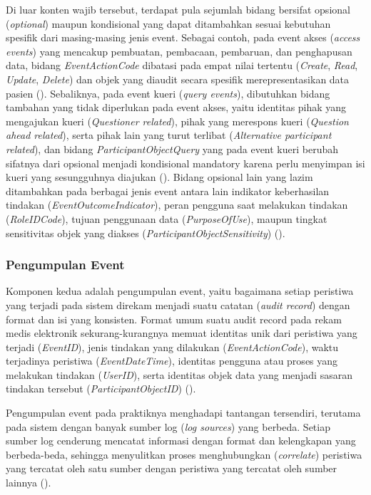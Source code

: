 Di luar konten wajib tersebut, terdapat pula sejumlah bidang bersifat opsional (\textit{optional}) maupun kondisional yang dapat ditambahkan sesuai kebutuhan spesifik dari masing-masing jenis event. Sebagai contoh, pada event akses (\textit{access events}) yang mencakup pembuatan, pembacaan, pembaruan, dan penghapusan data, bidang \textit{EventActionCode} dibatasi pada empat nilai tertentu (\textit{Create}, \textit{Read}, \textit{Update}, \textit{Delete}) dan objek yang diaudit secara spesifik merepresentasikan data pasien (\cite{iso27789_2021}). Sebaliknya, pada event kueri (\textit{query events}), dibutuhkan bidang tambahan yang tidak diperlukan pada event akses, yaitu identitas pihak yang mengajukan kueri (\textit{Questioner related}), pihak yang merespons kueri (\textit{Question ahead related}), serta pihak lain yang turut terlibat (\textit{Alternative participant related}), dan bidang \textit{ParticipantObjectQuery} yang pada event kueri berubah sifatnya dari opsional menjadi kondisional mandatory karena perlu menyimpan isi kueri yang sesungguhnya diajukan (\cite{iso27789_2021}). Bidang opsional lain yang lazim ditambahkan pada berbagai jenis event antara lain indikator keberhasilan tindakan (\textit{EventOutcomeIndicator}), peran pengguna saat melakukan tindakan (\textit{RoleIDCode}), tujuan penggunaan data (\textit{PurposeOfUse}), maupun tingkat sensitivitas objek yang diakses (\textit{ParticipantObjectSensitivity}) (\cite{iso27789_2021}).

\subsubsection{Pengumpulan Event}
\label{subsubsec:pengumpulan-event}

Komponen kedua adalah pengumpulan event, yaitu bagaimana setiap peristiwa yang terjadi pada sistem direkam menjadi suatu catatan (\textit{audit record}) dengan format dan isi yang konsisten. Format umum suatu audit record pada rekam medis elektronik sekurang-kurangnya memuat identitas unik dari peristiwa yang terjadi (\textit{EventID}), jenis tindakan yang dilakukan (\textit{EventActionCode}), waktu terjadinya peristiwa (\textit{EventDateTime}), identitas pengguna atau proses yang melakukan tindakan (\textit{UserID}), serta identitas objek data yang menjadi sasaran tindakan tersebut (\textit{ParticipantObjectID}) (\cite{iso27789_2021}).

Pengumpulan event pada praktiknya menghadapi tantangan tersendiri, terutama pada sistem dengan banyak sumber log (\textit{log sources}) yang berbeda. Setiap sumber log cenderung mencatat informasi dengan format dan kelengkapan yang berbeda-beda, sehingga menyulitkan proses menghubungkan (\textit{correlate}) peristiwa yang tercatat oleh satu sumber dengan peristiwa yang tercatat oleh sumber lainnya (\cite{nist80092}).

